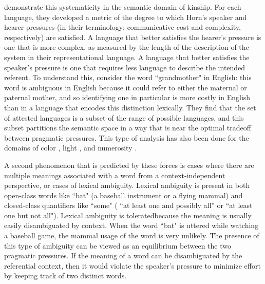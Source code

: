 \documentclass[man]{apa2}
\begin{document}
  demonstrate this systematicity in the semantic domain of kinship. For each language, they developed a metric of the degree to which  Horn's speaker and hearer pressures (in their terminology: communicative cost and complexity, respectively) are satisfied. A language that better satisfies the hearer's pressure is one that is more complex, as measured by the length of the description of the system in their representational language. A language that better satisfies the speaker's pressure is one that requires less language to describe the intended referent. To understand this, consider the word ``grandmother" in English: this word is ambiguous in English because it could refer to either the maternal or paternal mother, and so identifying one in particular is more costly in English than in a language that encodes this distinction lexically. They find that the set of attested languages is a subset of the range of possible languages, and this subset partitions the  semantic space in a way that is near the optimal tradeoff between pragmatic pressures. This type of analysis has also been done for the domains of color \cite{regier2007color}, light \cite{baddeley2009}, and numerosity \cite{xu4numeral}.
 
A second phenomenon that is predicted by these forces is cases where there are multiple meanings associated with a word from a context-independent perspective, or cases of lexical ambiguity. Lexical ambiguity is present in both open-class words like ``bat"  (a baseball instrument or a flying mammal) and closed-class quantifiers like ``some" ( ``at least one and possibly all''  or ``at least one but not all"). Lexical ambiguity is toleratedbecause the meaning is usually easily disambiguated by context. When the word ``bat" is uttered while watching a baseball game,  the mammal usage of the word is very unlikely. The presence of this type of ambiguity can be viewed as an equilibrium between the two pragmatic pressures. If the meaning of a word can be disambiguated by the referential context, then it would violate the speaker's pressure to minimize effort by keeping track of two distinct words.
\end{document}
